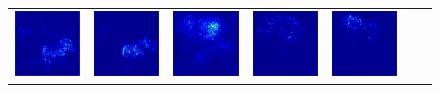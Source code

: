 \begin{figure}
\begin{center}
\begin{tabular}{ccccccc}
\includegraphics[width=0.14\linewidth,height=0.11\linewidth]{figs/examples/vggnet/soft/zeb-ele2_sali_341} &
\includegraphics[width=0.14\linewidth,height=0.11\linewidth]{figs/examples/googlenet/soft/zeb-ele2_sali_341} &
\includegraphics[width=0.14\linewidth,height=0.11\linewidth]{figs/examples/alexnet/soft/zeb-ele2_sali_387} &
\includegraphics[width=0.14\linewidth,height=0.11\linewidth]{figs/examples/vggnet/soft/zeb-ele2_sali_387} &
\includegraphics[width=0.14\linewidth,height=0.11\linewidth]{figs/examples/googlenet/soft/zeb-ele2_sali_387} \\

\end{tabular}
\end{center}
\end{figure}
